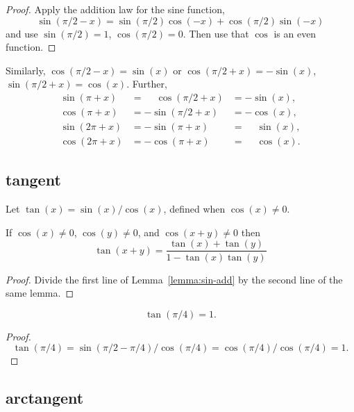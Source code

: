 \begin{proof}
    Apply the addition law for the sine function,
    $$\sin(\pi/2 - x) = \sin(\pi/2)\cos(-x) + \cos(\pi/2)\sin(-x)$$
    and use
    $\sin(\pi/2) = 1$, $\cos(\pi/2) = 0$.  Then use that $\cos$ is
    an even function.
\end{proof}

Similarly, $\cos(\pi/2 - x) = \sin(x)$ or $\cos(\pi/2 + x) =
-\sin(x)$, $\sin(\pi/2 + x) = \cos(x)$.  Further,
    $$\begin{array}{lll}
      \sin(\pi + x) &= \phantom{-}\cos(\pi/2 + x) &= -\sin(x),\\
      \cos(\pi + x) &= -\sin(\pi/2 + x) &= -\cos(x),\\
      \sin(2\pi + x) &= -\sin(\pi + x) &= \phantom{-}\sin(x),\\
      \cos(2\pi + x) &= -\cos(\pi + x) &= \phantom{-}\cos(x).
      \end{array}$$


\subsection{tangent}
\label{sec:tangent}

\begin{definition}\label{def:tan}
Let $\tan(x) = \sin(x)/\cos(x)$, defined when $\cos(x)\ne0$.
\end{definition}


\begin{lemma}\label{lemma:tan-add}
    If $\cos(x)\ne 0$, $\cos(y)\ne 0$, and $\cos(x+y)\ne0$ then
    $$\tan(x+y) = \frac{\tan(x) + \tan(y) }{ 1 - \tan(x)\tan(y)}$$
\end{lemma}

\begin{proof}
  Divide the first line of Lemma~\ref{lemma:sin-add} by the second
  line of the same lemma.
\end{proof}

\begin{lemma}\label{lemma:tan-pi4}
    $$\tan(\pi/4) = 1.$$
\end{lemma}

\begin{proof}
    $$\tan(\pi/4) = \sin(\pi/2-\pi/4)/\cos(\pi/4) =
    \cos(\pi/4)/\cos(\pi/4) = 1.$$
\end{proof}


\subsection{arctangent}

